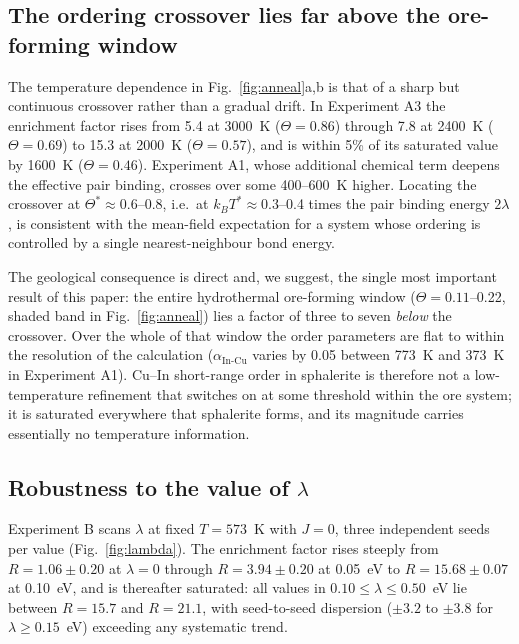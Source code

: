 \documentclass[11pt,a4paper]{article}
\newcommand{\aInCu}{\alpha_{\mathrm{In\text{-}Cu}}}
\begin{document}
\subsection{The ordering crossover lies far above the ore-forming window}
\label{sec:crossover}

The temperature dependence in Fig.~\ref{fig:anneal}a,b is that of a sharp but
continuous crossover rather than a gradual drift. In Experiment A3 the
enrichment factor rises from 5.4 at 3000~K ($\Theta = 0.86$) through 7.8 at
2400~K ($\Theta = 0.69$) to 15.3 at 2000~K ($\Theta = 0.57$), and is within 5\%
of its saturated value by 1600~K ($\Theta = 0.46$). Experiment A1, whose
additional chemical term deepens the effective pair binding, crosses over some
400--600~K higher. Locating the crossover at $\Theta^* \approx 0.6$--0.8, i.e.\
at $k_BT^* \approx 0.3$--0.4 times the pair binding energy $2\lambda$, is
consistent with the mean-field expectation for a system whose ordering is
controlled by a single nearest-neighbour bond energy.

The geological consequence is direct and, we suggest, the single most important
result of this paper: the entire hydrothermal ore-forming window
($\Theta = 0.11$--0.22, shaded band in Fig.~\ref{fig:anneal}) lies a factor of
three to seven \emph{below} the crossover. Over the whole of that window the
order parameters are flat to within the resolution of the calculation ($\aInCu$
varies by 0.05 between 773~K and 373~K in Experiment A1). Cu--In short-range
order in sphalerite is therefore not a low-temperature refinement that switches
on at some threshold within the ore system; it is saturated everywhere that
sphalerite forms, and its magnitude carries essentially no temperature
information.

\subsection{Robustness to the value of \texorpdfstring{$\lambda$}{lambda}}
\label{sec:lambdascan}

Experiment B scans $\lambda$ at fixed $T = 573$~K with $J = 0$, three
independent seeds per value (Fig.~\ref{fig:lambda}). The enrichment factor rises
steeply from $R = 1.06 \pm 0.20$ at $\lambda = 0$ through $R = 3.94 \pm 0.20$ at
0.05~eV to $R = 15.68 \pm 0.07$ at 0.10~eV, and is thereafter saturated: all
values in $0.10 \le \lambda \le 0.50$~eV lie between $R = 15.7$ and $R = 21.1$,
with seed-to-seed dispersion ($\pm 3.2$ to $\pm 3.8$ for
$\lambda \ge 0.15$~eV) exceeding any systematic trend.
\end{document}
